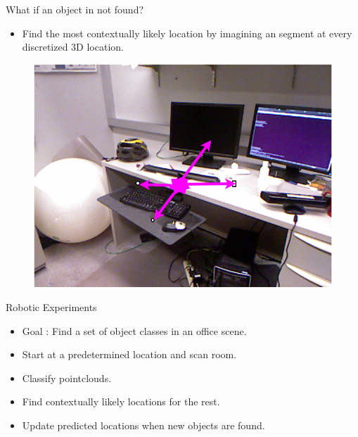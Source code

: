 \documentclass{beamer}
\begin{document}
\begin{frame}{What if an object in not found?}
\begin{itemize}
\item Find the most contextually likely location by imagining an segment at every discretized 3D location.
\end{itemize}
 \begin{figure}   
 \includegraphics[scale=0.3]{heatImage.png} 
 \end{figure}
\end{frame}


\begin{frame}{Robotic Experiments}

\begin{itemize}
\item Goal : Find a set of object classes in an office scene.
\item Start at a predetermined location and scan room. 
\item Classify pointclouds. 
\item Find contextually likely locations for the rest.
\item Update predicted locations when new objects are found.
\end{itemize}

\end{frame}
\end{document}

